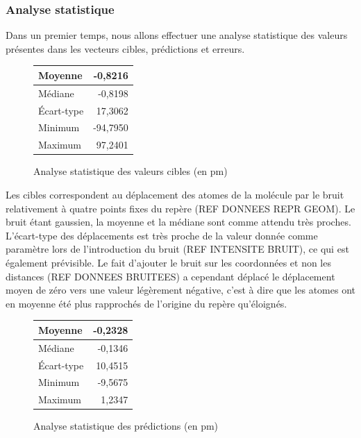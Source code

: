 \subsubsection{Analyse statistique}

\par Dans un premier temps, nous allons effectuer une analyse statistique des valeurs présentes dans les vecteurs cibles, prédictions et erreurs. \\


\begin{figure}[!h]
	\centering
	\begin{tabular}{|l|r|}
		\hline
		Moyenne & -0,8216 \\ \hline
		Médiane & -0,8198 \\ \hline
		Écart-type & 17,3062 \\ \hline
		Minimum & -94,7950 \\ \hline
		Maximum & 97,2401 \\ \hline
	\end{tabular}
	
	\caption{Analyse statistique des valeurs cibles (en pm)}
\end{figure}

Les cibles correspondent au déplacement des atomes de la molécule par le bruit relativement à quatre points fixes du repère (REF DONNEES REPR GEOM). Le bruit étant gaussien, la moyenne et la médiane sont comme attendu très proches. L'écart-type des déplacements est très proche de la valeur donnée comme paramètre lors de l'introduction du bruit (REF INTENSITE BRUIT), ce qui est également prévisible. Le fait d'ajouter le bruit sur les coordonnées et non les distances (REF DONNEES BRUITEES) a cependant déplacé le déplacement moyen de zéro vers une valeur légèrement négative, c'est à dire que les atomes ont en moyenne été plus rapprochés de l'origine du repère qu'éloignés.


\begin{figure}[!h]
	\centering
	\begin{tabular}{|l|r|}
		\hline
		Moyenne & -0,2328 \\ \hline
		Médiane & -0,1346 \\ \hline
		Écart-type & 10,4515 \\ \hline
		Minimum & -9,5675 \\ \hline
		Maximum & 1,2347 \\ \hline
	\end{tabular}
	
	\caption{Analyse statistique des prédictions (en pm)}
\end{figure}

